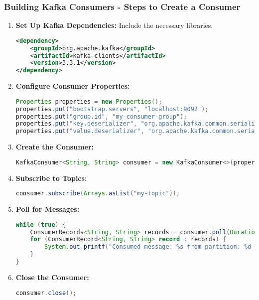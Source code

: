\documentclass[aspectratio=169]{beamer}
\begin{document}
\begin{frame}[fragile]
    \frametitle{Building Kafka Consumers - Steps to Create a Consumer}
    \begin{enumerate}
        \item \textbf{Set Up Kafka Dependencies:} Include the necessary libraries.
        \begin{lstlisting}[language=xml]
<dependency>
    <groupId>org.apache.kafka</groupId>
    <artifactId>kafka-clients</artifactId>
    <version>3.3.1</version>
</dependency>
        \end{lstlisting}
        
        \item \textbf{Configure Consumer Properties:} 
        \begin{lstlisting}[language=java]
Properties properties = new Properties();
properties.put("bootstrap.servers", "localhost:9092");
properties.put("group.id", "my-consumer-group");
properties.put("key.deserializer", "org.apache.kafka.common.serialization.StringDeserializer");
properties.put("value.deserializer", "org.apache.kafka.common.serialization.StringDeserializer");
        \end{lstlisting}
        
        \item \textbf{Create the Consumer:}
        \begin{lstlisting}[language=java]
KafkaConsumer<String, String> consumer = new KafkaConsumer<>(properties);
        \end{lstlisting}
        
        \item \textbf{Subscribe to Topics:}
        \begin{lstlisting}[language=java]
consumer.subscribe(Arrays.asList("my-topic"));
        \end{lstlisting}
        
        \item \textbf{Poll for Messages:}
        \begin{lstlisting}[language=java]
while (true) {
    ConsumerRecords<String, String> records = consumer.poll(Duration.ofMillis(100));
    for (ConsumerRecord<String, String> record : records) {
        System.out.printf("Consumed message: %s from partition: %d and offset: %d%n", record.value(), record.partition(), record.offset());
    }
}
        \end{lstlisting}
        
        \item \textbf{Close the Consumer:}
        \begin{lstlisting}[language=java]
consumer.close();
        \end{lstlisting}
    \end{enumerate}
\end{frame}
\end{document}
